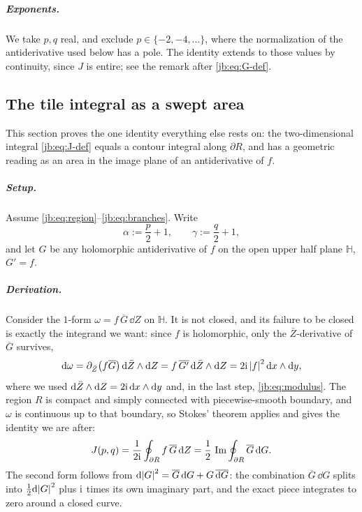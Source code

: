 \subparagraph{Exponents.}
We take $p, q$ real, and exclude $p \in \{-2, -4, \dots\}$, where the normalization of the
antiderivative used below has a pole.
The identity extends to those values by continuity, since $J$ is entire; see the remark after
\eqref{jb:eq:G-def}.


\subsection{The tile integral as a swept area}
\label{jb:sec:stokes}


This section proves the one identity everything else rests on: the two-dimensional integral
\eqref{jb:eq:J-def} equals a contour integral along $\partial R$, and has a geometric reading as an
area in the image plane of an antiderivative of $f$.

\subparagraph{Setup.}
Assume \eqref{jb:eq:region}--\eqref{jb:eq:branches}.
Write
\begin{equation}
  \label{jb:eq:alpha-gamma}
  \alpha
    := \frac{p}{2} + 1,
  \qquad
  \gamma
    := \frac{q}{2} + 1,
\end{equation}
and let $G$ be any holomorphic antiderivative of $f$ on the open upper half plane $\mathbb{H}$,
$G' = f$.

\subparagraph{Derivation.}
Consider the $1$-form $\omega = f \, \overline{G} \, \dd Z$ on $\mathbb{H}$.
It is not closed, and its failure to be closed is exactly the integrand we want: since $f$ is
holomorphic, only the $\bar Z$-derivative of $\overline{G}$ survives,
\begin{equation}
  \label{jb:eq:domega}
  \mathrm{d} \omega
    = \partial_{\bar Z} \bigl( f \overline{G} \bigr) \, \mathrm{d} \bar Z \wedge \mathrm{d} Z
    = f \, \overline{G'} \, \mathrm{d} \bar Z \wedge \mathrm{d} Z
    = 2 \mathrm{i} \, {|f|}^2 \, \mathrm{d} x \wedge \mathrm{d} y,
\end{equation}
where we used $\mathrm{d} \bar Z \wedge \mathrm{d} Z = 2 \mathrm{i} \, \mathrm{d} x \wedge \mathrm{d} y$ and, in the last step,
\eqref{jb:eq:modulus}.
The region $R$ is compact and simply connected with piecewise-smooth boundary, and $\omega$ is
continuous up to that boundary, so Stokes' theorem applies and gives the identity we are after:
\begin{equation}
  \label{jb:eq:stokes}
  J(p, q)
    = \frac{1}{2 \mathrm{i}} \oint_{\partial R} f \, \overline{G} \, \mathrm{d} Z
    = \frac12 \, \operatorname{Im} \oint_{\partial R} \overline{G} \, \mathrm{d} G .
\end{equation}
The second form follows from $\mathrm{d} {|G|}^2 = \overline{G} \, \mathrm{d} G + G \, \overline{\mathrm{d} G}$: the
combination $\overline{G} \, \dd G$ splits into $\tfrac12 \mathrm{d} {|G|}^2$ plus $\mathrm{i}$ times its own
imaginary part, and the exact piece integrates to zero around a closed curve.

